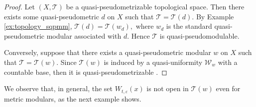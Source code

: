 \documentclass[11pt,a4paper]{amsart}
\theoremstyle{definition}
\begin{document}
	\begin{proof}
		Let $(X,\mathcal{T})$ be a quasi-pseudometrizable topological space. Then there exists some quasi-pseudometric $d$ on $X$ such that $\mathcal{T}=\mathcal{T}(d)$. By Example \ref{ex:topology_sqpmm}, $\mathcal{T}(d)=\mathcal{T}(w_d),$ where $w_d$ is the standard quasi-pseudometric modular associated with $d.$ Hence $\mathcal{T}$ is quasi-pseudomodulable.
		
		
		Conversely, suppose that there exists a quasi-pseudometric modular $w$ on $X$ such that $\mathcal{T}=\mathcal{T}(w)$. Since $\mathcal{T}(w)$ is induced by a quasi-uniformity $\mathcal{W}_w$ with a countable base, then it is quasi-pseudometrizable \cite{FL82}.
	\end{proof}
	
	We observe that, in general, the set $W_{t,\varepsilon}(x)$ is not open in $\mathcal{T}(w)$ even for metric modulars, as the next example shows.
	
\end{document}
